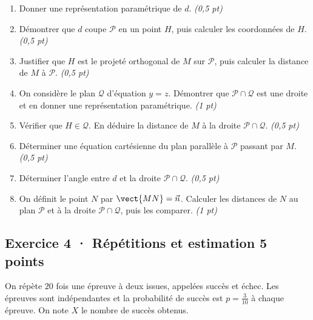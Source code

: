 \begin{enumerate}

\item Donner une représentation paramétrique de $d$. \hfill\textit{(0{,}5 pt)}

\item Démontrer que $d$ coupe $\mathcal P$ en un point $H$, puis calculer les coordonnées de $H$. \hfill\textit{(0{,}5 pt)}

\item Justifier que $H$ est le projeté orthogonal de $M$ sur $\mathcal P$, puis calculer la distance de $M$ à $\mathcal P$. \hfill\textit{(0{,}5 pt)}

\item On considère le plan $\mathcal Q$ d'équation $y=z$. Démontrer que $\mathcal P\cap\mathcal Q$ est une droite et en donner une représentation paramétrique. \hfill\textit{(1 pt)}

\item Vérifier que $H\in\mathcal Q$. En déduire la distance de $M$ à la droite $\mathcal P\cap\mathcal Q$. \hfill\textit{(0{,}5 pt)}

\item Déterminer une équation cartésienne du plan parallèle à $\mathcal P$ passant par $M$. \hfill\textit{(0{,}5 pt)}

\item Déterminer l'angle entre $d$ et la droite $\mathcal P\cap\mathcal Q$. \hfill\textit{(0{,}5 pt)}

\item On définit le point $N$ par $\vect{MN}=\vec n$. Calculer les distances de $N$ au plan $\mathcal P$ et à la droite $\mathcal P\cap\mathcal Q$, puis les comparer. \hfill\textit{(1 pt)}

\end{enumerate}

\subsection*{Exercice 4 · Répétitions et estimation \hfill 5 points}On répète $20$ fois une épreuve à deux issues, appelées succès et échec. Les épreuves sont indépendantes et la probabilité de succès est $p=\frac{3}{10}$ à chaque épreuve. On note $X$ le nombre de succès obtenus.

